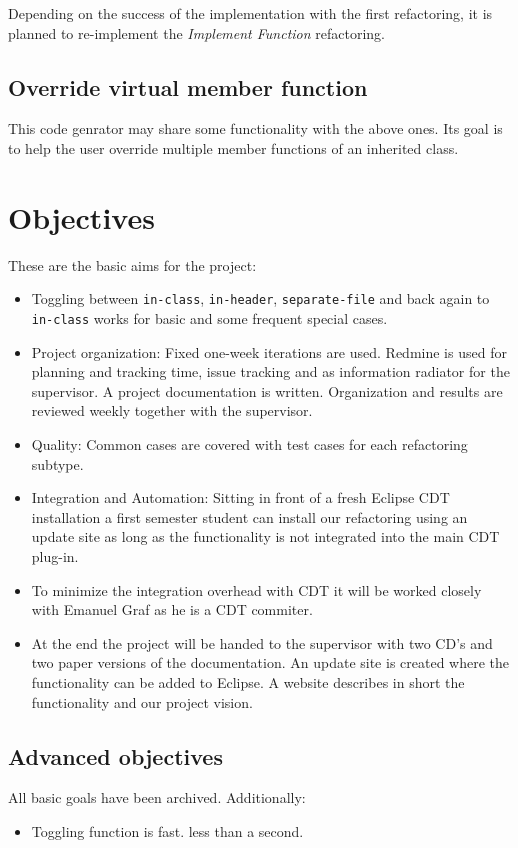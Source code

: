 Depending on the success of the implementation with the first refactoring, it is 
planned to re-implement the \textit{Implement Function} refactoring.

\subsection{Override virtual member function}
This code genrator may share some functionality with the above ones. Its goal is 
to help the user override multiple member functions of an inherited class.

\section{Objectives}

These are the basic aims for the project:
\begin{itemize}
 \item Toggling between \texttt{in-class}, \texttt{in-header},
\texttt{separate-file} and back again to \texttt{in-class} works for basic and
some frequent special cases.
 \item Project organization: Fixed one-week iterations are used. Redmine is used
for planning and tracking time, issue tracking and as information radiator for
the supervisor. A project documentation is written. Organization and results are
reviewed weekly together with the supervisor.
 \item Quality: Common cases are covered with test cases for each
refactoring subtype.
 \item Integration and Automation: Sitting in front of a fresh Eclipse CDT
installation a first semester student can install our refactoring using an
update site as long as the functionality is not integrated into the main CDT
plug-in.
 \item To minimize the integration overhead with CDT it will be worked closely
with Emanuel Graf as he is a CDT commiter.
 \item At the end the project will be handed to the supervisor with two CD's and
two paper versions of the documentation. An update site is created where the
functionality can be added to Eclipse. A website describes in short the
functionality and our project vision.
\end{itemize}

\subsection{Advanced objectives}
All basic goals have been archived. Additionally:
\begin{itemize}
 \item Toggling function is fast. less than a second.
\end{itemize}

